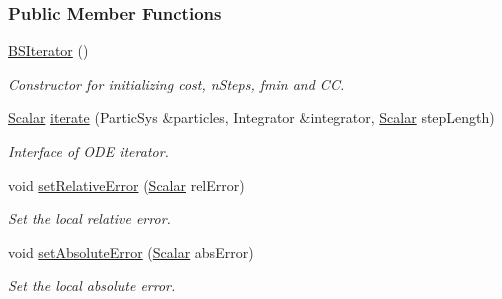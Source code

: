\subsubsection*{Public Member Functions}
\begin{DoxyCompactItemize}
\item 
\mbox{\hyperlink{class_b_s_iterator_a144fb5c55fcd7bc873e73f4d06276fb2}{B\+S\+Iterator}} ()
\begin{DoxyCompactList}\small\item\em Constructor for initializing cost, n\+Steps, fmin and CC. \end{DoxyCompactList}\item 
\mbox{\hyperlink{class_b_s_iterator_a7857f8ff9032955ea4dcc22cd18ca7a1}{Scalar}} \mbox{\hyperlink{class_b_s_iterator_a5520642ecbd454fb1f4d9ece18dc4e3f}{iterate}} (Partic\+Sys \&particles, Integrator \&integrator, \mbox{\hyperlink{class_b_s_iterator_a7857f8ff9032955ea4dcc22cd18ca7a1}{Scalar}} step\+Length)
\begin{DoxyCompactList}\small\item\em Interface of O\+DE iterator. \end{DoxyCompactList}\item 
void \mbox{\hyperlink{class_b_s_iterator_ada9b6cc673e297135646699d581fcdc7}{set\+Relative\+Error}} (\mbox{\hyperlink{class_b_s_iterator_a7857f8ff9032955ea4dcc22cd18ca7a1}{Scalar}} rel\+Error)
\begin{DoxyCompactList}\small\item\em Set the local relative error. \end{DoxyCompactList}\item 
void \mbox{\hyperlink{class_b_s_iterator_a57603539823be271c2229d0951b7d957}{set\+Absolute\+Error}} (\mbox{\hyperlink{class_b_s_iterator_a7857f8ff9032955ea4dcc22cd18ca7a1}{Scalar}} abs\+Error)
\begin{DoxyCompactList}\small\item\em Set the local absolute error. \end{DoxyCompactList}\end{DoxyCompactItemize}
